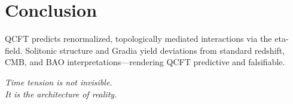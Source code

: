 \documentclass[12pt]{article}
\begin{document}
\section*{Conclusion}

QCFT predicts renormalized, topologically mediated interactions via the eta-field. Solitonic structure and Gradia yield deviations from standard redshift, CMB, and BAO interpretations—rendering QCFT predictive and falsifiable.

\begin{center}
\textit{Time tension is not invisible.\\It is the architecture of reality.}
\end{center}
\end{document}
